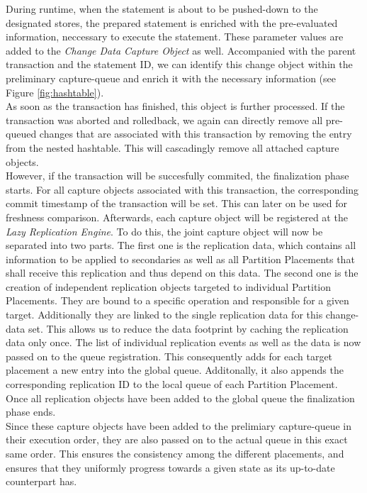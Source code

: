 During runtime, when the statement is about to be pushed-down to the designated stores, the prepared statement is enriched with the pre-evaluated information, 
neccessary to execute the statement. These parameter values are added to the \emph{Change Data Capture Object} as well. 
Accompanied with the parent transaction and the statement ID, we can identify this change object within the preliminary capture-queue 
and enrich it with the necessary information (see Figure \ref{fig:hashtable}).\\
As soon as the transaction has finished, this object is further processed. If the transaction was aborted and rolledback, we again can directly remove all pre-queued changes 
that are associated with this transaction by removing the entry from the nested hashtable. This will cascadingly remove all attached capture objects.\\
However, if the transaction will be succesfully commited, the finalization phase starts. For all capture objects associated with this transaction, the corresponding commit 
timestamp of the transaction will be set. This can later on be used for freshness comparison. Afterwards, each capture object will be registered at the \emph{Lazy Replication Engine}. 
To do this, the joint capture object will now be separated into two parts. The first one is the replication data, which contains all information to be applied to 
secondaries as well as all Partition Placements that shall receive this replication and thus depend on this data. The second one is the creation of independent replication 
objects targeted to individual Partition Placements. They are bound to a specific operation and responsible for a given target. Additionally they are linked to the single replication data for this change-data set.
This allows us to reduce the data footprint by caching the replication data only once. The list of individual replication events as well as the data is now passed on to the
queue registration. This consequently adds for each target placement a new entry into the global queue. Additonally, it also appends the corresponding replication ID to 
the local queue of each Partition Placement. Once all replication objects have been added to the global queue the finalization phase ends.\\
Since these capture objects have been added to the prelimiary capture-queue in their execution order, they are also passed on to the actual queue in this exact same order.
This ensures the consistency among the different placements, and ensures that they uniformly progress towards a given state as its up-to-date counterpart has.

